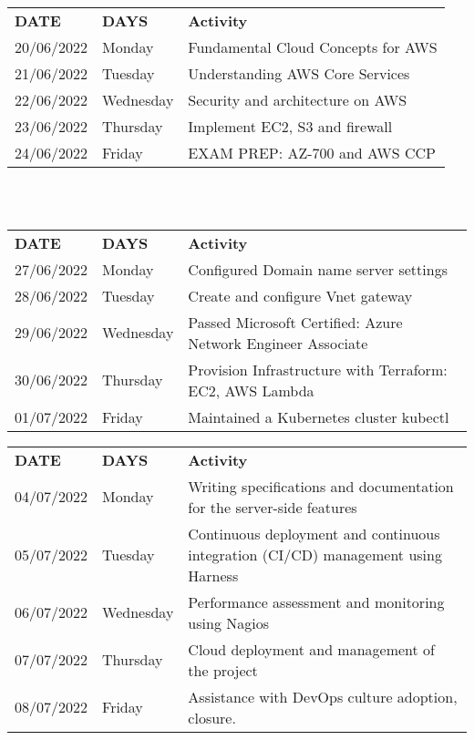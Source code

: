 \begin{tabular}{ |p{3cm}|p{3cm}|p{7cm}|  }
\hline

\rowcolor[gray]{0.9}\multicolumn{3}{|c|}{ WEEK 2: Training} \\
\hline
\textbf{DATE}& \textbf{DAYS}& \textbf{Activity}\\
\hline
20/06/2022 & Monday &Fundamental Cloud Concepts for AWS \\
\hline
21/06/2022  & Tuesday   & Understanding AWS Core Services \\
\hline
22/06/2022  &Wednesday & Security and architecture on AWS \\
\hline
23/06/2022   &Thursday & Implement EC2, S3 and firewall \\
\hline
24/06/2022  & Friday & EXAM PREP: AZ-700 and AWS CCP \\
\hline
\end{tabular}
\begin{tabular}{ |p{3cm}|p{3cm}|p{7cm}|  }
\hline
\hline
\end{tabular} \\
\begin{tabular}{ |p{3cm}|p{3cm}|p{7cm}|  }
\hline
\rowcolor[gray]{0.9}\multicolumn{3}{|c|}{ WEEK 3} \\
\hline
\textbf{DATE}& \textbf{DAYS}& \textbf{Activity}\\
\hline
27/06/2022 & Monday &Configured Domain name server settings \\
\hline
28/06/2022  & Tuesday   & Create and configure Vnet gateway \\
\hline
29/06/2022  &Wednesday & Passed Microsoft Certified: Azure Network Engineer Associate \\
\hline
30/06/2022   &Thursday & Provision Infrastructure with Terraform: EC2, AWS Lambda \\
\hline
01/07/2022  & Friday & Maintained a Kubernetes cluster kubectl \\
\hline
\end{tabular}
\newline
\newline\begin{tabular}{ |p{3cm}|p{3cm}|p{7cm}|  }
\hline

\rowcolor[gray]{0.9}\multicolumn{3}{|c|}{ WEEK 4} \\
\hline
\textbf{DATE}& \textbf{DAYS}& \textbf{Activity}\\
\hline
04/07/2022 & Monday & Writing specifications and documentation for the server-side features \\
\hline
05/07/2022  & Tuesday   & Continuous deployment and continuous integration (CI/CD) management using Harness \\
\hline
06/07/2022  &Wednesday & Performance assessment and monitoring using
Nagios \\
\hline
07/07/2022   &Thursday & Cloud deployment and management of the project \\
\hline
08/07/2022  & Friday & Assistance with DevOps culture adoption, closure. \\
\hline
\end{tabular}
\newline

